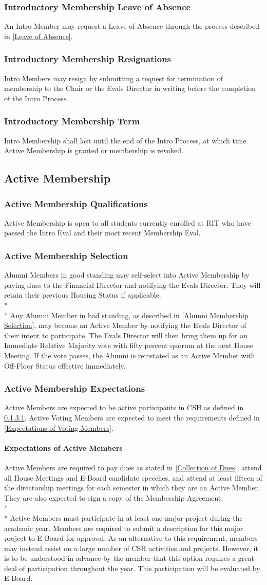 \documentclass{article}
\newcommand{\asection}[1]{\subsection{#1} \label{#1}}
\newcommand{\asubsection}[1]{\subsubsection{#1} \label{#1}}
\newcommand{\asubsubsection}[1]{\paragraph{#1} \label{#1}}
\begin{document}
\asubsection{Introductory Membership Leave of Absence}
An Intro Member may request a Leave of Absence through the process described in \ref{Leave of Absence}.

\asubsection{Introductory Membership Resignations}
Intro Members may resign by submitting a request for termination of membership to the Chair or the Evals Director in writing before the completion of the Intro Process.

\asubsection{Introductory Membership Term}
Intro Membership shall last until the end of the Intro Process, at which time Active Membership is granted or membership is revoked.

\asection{Active Membership}

\asubsection{Active Membership Qualifications}
Active Membership is open to all students currently enrolled at RIT who have passed the Intro Eval and their most recent Membership Eval.

\asubsection{Active Membership Selection}
Alumni Members in good standing may self-select into Active Membership by paying dues to the Financial Director and notifying the Evals Director. They will retain their previous Housing Status if applicable.
\\*\\*
Any Alumni Member in bad standing, as described in \ref{Alumni Membership Selection}, may become an Active Member by notifying the Evals Director of their intent to participate.
The Evals Director will then bring them up for an Immediate Relative Majority vote with fifty percent quorum at the next House Meeting.
If the vote passes, the Alumni is reinstated as an Active Member with Off-Floor Status effective immediately.

\asubsection{Active Membership Expectations}
Active Members are expected to be active participants in CSH as defined in \ref{Expectations of Active Members}.
Active Voting Members are expected to meet the requirements defined in \ref{Expectations of Voting Members}.

\asubsubsection{Expectations of Active Members}
Active Members are required to pay dues as stated in \ref{Collection of Dues}, attend all House Meetings and E-Board candidate speeches, and attend at least fifteen of the directorship meetings for each semester in which they are an Active Member.
They are also expected to sign a copy of the Membership Agreement.
\\* \\*
Active Members must participate in at least one major project during the academic year.
Members are required to submit a description for this major project to E-Board for approval.
As an alternative to this requirement, members may instead assist on a large number of CSH activities and projects.
However, it is to be understood in advance by the member that this option requires a great deal of participation throughout the year.
This participation will be evaluated by E-Board.
\end{document}
